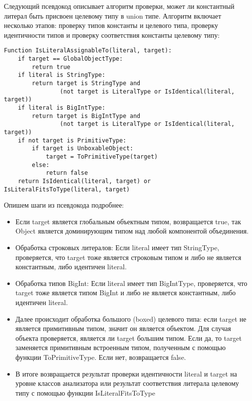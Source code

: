 Следующий псевдокод описывает алгоритм проверки, может ли константный литерал быть присвоен целевому типу в union типе.
Алгоритм включает несколько этапов: проверку типов константы и целевого типа, проверку идентичности типов и проверку
соответствия константы целевому типу:

\begin{lstlisting}[label={lst:literalassignable}]
Function IsLiteralAssignableTo(literal, target):
    if target == GlobalObjectType:
        return true
    if literal is StringType:
        return target is StringType and
                (not target is LiteralType or IsIdentical(literal, target))
    if literal is BigIntType:
        return target is BigIntType and
                (not target is LiteralType or IsIdentical(literal, target))
    if not target is PrimitiveType:
        if target is UnboxableObject:
            target = ToPrimitiveType(target)
        else:
            return false
    return IsIdentical(literal, target) or IsLiteralFitsToType(literal, target)
\end{lstlisting}
Опишем шаги из псевдокода подробнее:

\begin{itemize}[left=2em]
    \item Если target является глобальным объектным типом, возвращается true, так Object является доминирующим типом
    над любой компонентой объединения. 
    \item Обработка строковых литералов: Если literal имеет тип StringType, проверяется, что target тоже является 
    строковым типом и либо не является константным, либо идентичен literal. 
    \item Обработка типов BigInt: Если literal имеет тип BigIntType, проверяется, что target тоже является типом
    BigInt и либо не является константным, либо идентичен literal. 
    \item Далее происходит обработка большого (boxed) целевого типа:
    если target не является примитивным типом, значит он является объектом.
    Для случая объекта проверяется, является ли target большим типом.
    Если да, то target заменяется примитивным встроенным типом, полученным с помощью функции ToPrimitiveType.
    Если нет, возвращается false. 
    \item В итоге возвращается результат проверки идентичности literal и target на уровне классов анализатора или
    результат соответствия литерала целевому типу с помощью функции IsLiteralFitsToType
\end{itemize}

